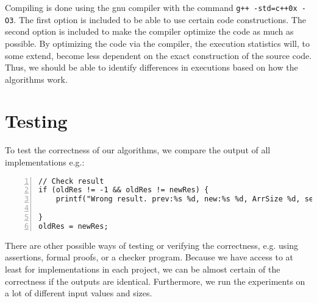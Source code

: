 Compiling is done using the gnu compiler with the command \verb!g++ -std=c++0x -O3!.
The first option is included to be able to use certain code constructions.
The second option is included to make the compiler optimize the code as much as
possible.
By optimizing the code via the compiler, the execution statistics will, to some
extend, become less dependent on the exact construction of the source code.
Thus, we should be able to identify differences in executions based on how the
algorithms work.


\section{Testing}
To test the correctness of our algorithms, we compare the output of all implementations e.g.:
 \begin{lstlisting}[numbers=left]
 // Check result
if (oldRes != -1 && oldRes != newRes) {
	printf("Wrong result. prev:%s %d, new:%s %d, ArrSize %d, searchFor %d\n", algo_labels[iAlg-1], oldRes, algo_labels[iAlg], newRes, arrSize, searchFor); 
 					
}
oldRes = newRes;
\end{lstlisting}
There are other possible ways of testing or verifying the correctness, e.g. using assertions, formal proofs, or a checker program.
Because we have access to at least for implementations in each project, we can be almost certain of the correctness if the outputs are identical.
Furthermore, we run the experiments on a lot of different input values and sizes.

